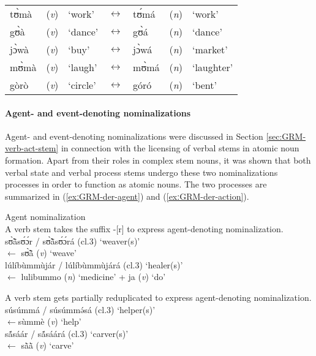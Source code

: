 \begin{exe}
\begin{exe}
\begin{exe}
{\begin{exe}
\begin{exe}
\begin{exe}
\begin{exe}
 \ea\label{exːGRM-der-cat-switch}
 
 \begin{tabular}{lllllll}

tʊ̀mà & ({\it v})   & {\rm `work'}  &  $\leftrightarrow$ &  tʊ́má  & ({\it n})  &  {\rm `work'}\\
gʊ̀à  & ({\it v})  &   {\rm `dance'}  & $\leftrightarrow$ &  gʊ̀á  & ({\it n})  &  {\rm `dance'}\\
jɔ̀wà &  ({\it v})  &{\rm `buy'}  & $\leftrightarrow$& jɔ̀wá&  ({\it n})   &{\rm `market'}\\
mʊ̀mà & ({\it v}) & {\rm `laugh'}&  $\leftrightarrow$ &mʊ̀má &({\it n}) &{\rm  `laughter'} \\
gòrò &({\it v}) & {\rm `circle'} & $\leftrightarrow$& góró &({\it n}) & {\rm `bent'}  
 \end{tabular}

\z


\paragraph{Agent- and event-denoting nominalizations}
\label{sec:GRM-der-agent}

Agent- and event-denoting nominalizations were discussed in
Section \ref{sec:GRM-verb-act-stem} in connection with the licensing of verbal
stems in atomic noun formation. Apart from their roles in complex stem nouns, it
was shown that both verbal state and verbal process stems undergo these two
nominalizations processes in order to function as atomic nouns.
The two
processes are summarized in (\ref{exːGRM-der-agent}) and 
(\ref{exːGRM-der-action}). 

\ea\label{exːGRM-der-agent}{\rm Agent nominalization}\\

\ea\label{exːGRM-der-agent-suffix}
{\rm A verb stem takes the suffix -[r]  to express agent-denoting
nominalization.}\\
{\sls  sʊ̃̀ã̀sʊ́ɔ́r} / {\sls sʊ̃̀ã̀sʊ́ɔ́rá} {\rm ({\sc cl.3}) `weaver(s)'}\\
  $\leftarrow$  {\sls sʊ̃̀ã̀} ({\it v}) {\rm  `weave'}\\
{\sls  lúlíbùmmùjár} / {\sls lúlíbùmmùjárá}  {\rm ({\sc cl.3})  `healer(s)' }
\\
 $\leftarrow$ {\sls lulibummo} ({\it n}) {\rm `medicine'} + {\sls ja} ({\it v})  {\rm `do'}


 \ex\label{exːGRM-der-agent-redup}
{\rm A verb stem gets partially reduplicated   to express
agent-denoting nominalization.}\\
{\sls  súsúmmá} / {\sls súsúmmə́sá} ({\sc cl.3})   {\rm`helper(s)'}\\
 $\leftarrow${\sls sùmmè} ({\it v})  {\rm `help'}\\
{\sls  sã́sáár} / {\sls sã́sáárá} ({\sc cl.3})  {\rm  `carver(s)'}\\
 $\leftarrow$ {\sls sã̀ã̀} ({\it v})  {\rm `carve' }


\end{exe}
\end{exe}
\end{exe}
\end{exe}}
\end{exe}
\end{exe}
\end{exe}
